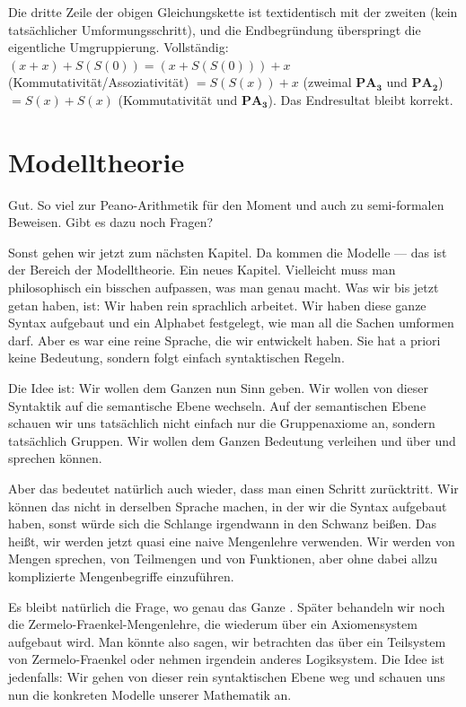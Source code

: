 \begin{ai-note}
Die dritte Zeile der obigen Gleichungskette ist textidentisch mit der zweiten (kein tatsächlicher Umformungsschritt), und die Endbegründung  überspringt die eigentliche Umgruppierung. Vollständig: $(x+x)+S(S(0)) = (x+S(S(0)))+x$ (Kommutativität/Assoziativität) $= S(S(x))+x$ (zweimal $\mathbf{PA_3}$ und $\mathbf{PA_2}$) $= S(x)+S(x)$ (Kommutativität und $\mathbf{PA_3}$). Das Endresultat bleibt korrekt.
\end{ai-note}

\section{Modelltheorie}

\begin{spoken-clean}[00:31:45 - 00:33:15]
Gut. So viel zur Peano-Arithmetik für den Moment und auch zu semi-formalen Beweisen. Gibt es dazu noch Fragen?

Sonst gehen wir jetzt zum nächsten Kapitel. Da kommen die Modelle --- das ist der Bereich der Modelltheorie. Ein neues Kapitel.  Vielleicht muss man philosophisch ein bisschen aufpassen, was man genau macht. Was wir bis jetzt getan haben, ist: Wir haben rein sprachlich arbeitet. Wir haben diese ganze Syntax aufgebaut und ein Alphabet festgelegt, wie man all die Sachen umformen darf. Aber es war eine reine Sprache, die wir entwickelt haben. Sie hat a priori keine Bedeutung, sondern folgt einfach syntaktischen Regeln.
\end{spoken-clean}

\begin{spoken-clean}[00:33:15 - 00:35:40]
Die Idee ist: Wir wollen dem Ganzen nun Sinn geben. Wir wollen von dieser Syntaktik auf die semantische Ebene wechseln. Auf der semantischen Ebene schauen wir uns tatsächlich nicht einfach nur die Gruppenaxiome an, sondern tatsächlich Gruppen. Wir wollen dem Ganzen Bedeutung verleihen und über  und  sprechen können.

Aber das bedeutet natürlich auch wieder, dass man einen Schritt zurücktritt. Wir können das nicht in derselben Sprache machen, in der wir die Syntax aufgebaut haben, sonst würde sich die Schlange irgendwann in den Schwanz beißen. Das heißt, wir werden jetzt quasi eine naive Mengenlehre verwenden. Wir werden von Mengen sprechen, von Teilmengen und von Funktionen, aber ohne dabei allzu komplizierte Mengenbegriffe einzuführen.

Es bleibt natürlich die Frage, wo genau das Ganze . Später behandeln wir noch die Zermelo-Fraenkel-Mengenlehre, die wiederum über ein Axiomensystem aufgebaut wird. Man könnte also sagen, wir betrachten das über ein Teilsystem von Zermelo-Fraenkel oder nehmen irgendein anderes Logiksystem. Die Idee ist jedenfalls: Wir gehen von dieser rein syntaktischen Ebene weg und schauen uns nun die konkreten Modelle unserer Mathematik an.
\end{spoken-clean}

